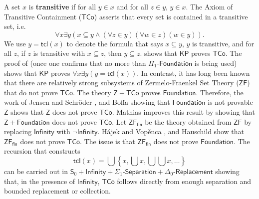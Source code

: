 \documentclass[11pt, a4paper]{article}
\newcounter{Prop1}
\newcounter{Theor1}
\begin{document}
A set $x$ is {\bf transitive} if for all $y \in x$ and for all $z \in y$, $y \in x$. The Axiom of Transitive Containment ($\mathsf{TCo}$) asserts that every set is contained in a transitive set, i.e.
\[
\forall x \exists y(x \subseteq y \land (\forall z \in y)(\forall w \in z)(w \in y)).
\]
We use $y=\mathsf{tcl}(x)$ to denote the formula that says $x \subseteq y$, $y$ is transitive, and for all $z$, if $z$ is transitive with $x \subseteq z$, then $y \subseteq z$. \cite[Proposition 1.20]{mat01} shows that $\mathsf{KP}$ proves $\mathsf{TCo}$. The proof of \cite[Theorem I.6.1]{bar75} (once one confirms that no more than $\Pi_1\textsf{-Foundation}$ is being used) shows that $\mathsf{KP}$ proves $\forall x \exists y(y= \mathsf{tcl}(x))$. In contrast, it has long been known that there are relatively strong subsystems of Zermelo-Fraenkel Set Theory ($\mathsf{ZF}$) that do not prove $\mathsf{TCo}$. The theory $\mathsf{Z}+\mathsf{TCo}$ proves $\textsf{Foundation}$. Therefore, the work of Jensen and Schr\"{o}der \cite{js69}, and Boffa \cite{bof69, bof70} showing that $\mathsf{Foundation}$ is not provable $\mathsf{Z}$ shows that $\mathsf{Z}$ does not prove $\mathsf{TCo}$. Mathias \cite[\S 12]{mat06} improves this result by showing that $\mathsf{Z}+\textsf{Foundation}$ does not prove $\mathsf{TCo}$. Let $\mathsf{ZF}_{\textsf{fin}}$ be the theory obtained from $\mathsf{ZF}$ by replacing $\textsf{Infinity}$ with $\neg \textsf{Infinity}$. H\'{a}jek and Vop\v{e}nca \cite{hv63}, and Hauschild \cite{hau66} show that $\mathsf{ZF}_{\textsf{fin}}$ does not prove $\mathsf{TCo}$. The issue is that $\mathsf{ZF}_{\textsf{fin}}$ does not prove $\textsf{Foundation}$. The recursion that constructs
\[
\mathsf{tcl}(x)= \bigcup \left\{ x, \bigcup x, \bigcup\bigcup x, \ldots \right\}
\]     
can be carried out in $\mathsf{S}_0+\textsf{Infinity}+\Sigma_1\textsf{-Separation}+\Delta_0\textsf{-Replacement}$ showing that, in the presence of $\textsf{Infinity}$, $\mathsf{TCo}$ follows directly from enough separation and bounded replacement or collection.
\end{document}

